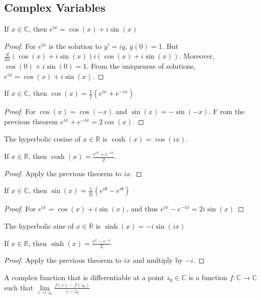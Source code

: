 \documentclass[crop=false,class=book,oneside]{standalone}
\begin{document}
\subsection{Complex Variables}
\begin{theorem}
If $x\in\mathbb{C}$, then $e^{ix}=\cos(x)+i\sin(x)$
\end{theorem}
\begin{proof}
For $e^{ix}$ is the solution to $y'=iy$, $y(0)=1$. But $\frac{d}{dx}(\cos(x)+i\sin(x))i(\cos(x)+i\sin(x))$. Moreover, $\cos(0)+i\sin(0)=1$. From the uniqueness of solutions, $e^{ix}=\cos(x)+i\sin(x)$. 
\end{proof}
\begin{theorem}
If $x\in \mathbb{C}$, then $\cos(x)=\frac{1}{2}(e^{ix}+e^{-ix})$
\end{theorem}
\begin{proof}
For $\cos(x)=\cos(-x)$ and $\sin(x)=-\sin(-x)$. F rom the previous theorem $e^{ix}+e^{-ix} = 2\cos(x)$.
\end{proof}
\begin{definition}
The hyperbolic cosine of $x\in \mathbb{R}$ is $\cosh(x)=\cos(ix)$.
\end{definition}
\begin{theorem}
If $x\in\mathbb{R}$, then $\cosh(x)=\frac{e^{ix}+e^{-ix}}{2}$.
\end{theorem}
\begin{proof}
Apply the previous theorem to $ix$.
\end{proof}
\begin{theorem}
If $x\in\mathbb{C}$, then $\sin(x)=\frac{1}{2i}(e^{i\theta}-e^{i\theta})$
\end{theorem}
\begin{proof}
For $e^{ix} = \cos(x)+i\sin(x)$, and thus $e^{ix}-e^{-ix}=2i\sin(x)$
\end{proof}
\begin{definition}
The hyperbolic sine of $x\in\mathbb{R}$ is $\sinh(x)=-i\sin(ix)$
\end{definition}
\begin{theorem}
If $x\in\mathbb{R}$, then $\sinh(x)=\frac{e^{x}-e^{-x}}{2}$
\end{theorem}
\begin{proof}
Apply the previous theorem to $ix$ and multiply by $-i$.
\end{proof}
\begin{definition}
A complex function that is differentiable at a point $z_{0}\in\mathbb{C}$ is a function $f:\mathbb{C}\rightarrow\mathbb{C}$ such that $\underset{z\rightarrow z_{0}}{\lim}\frac{f(z)-f(z_{0})}{z-z_{0}}$
\end{definition}
\end{document}
